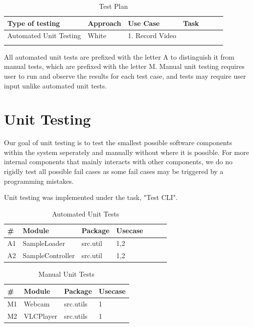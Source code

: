 \documentclass[12pt,a4paper,man]{report}
\begin{document}
\begin{table}[htbp]
\caption{\label{table:testt}
Test Plan}
\centering
\begin{tabular}{|l|l|l|l|l|lp{3cm}|}
\hline
\textbf{Type of testing} & \textbf{Approach} & \textbf{Use Case} & \textbf{Task}\\
\hline
Automated Unit Testing & White & 1. Record Video & \\
 &  &  & \\
\end{tabular}
\end{table}


All automated unit tests are prefixed with the letter A to distinguish it from manual tests, which are prefixed with the letter M. Manual unit testing requires user to run and observe the results for each test case, and tests may require user input unlike automated unit tests.

\section{Unit Testing}
\label{sec:org2c6beea}
Our goal of unit testing is to test the smallest possible software components within the system seperately and manually without where it is possible. For more internal components that mainly interacts with other components, we do no rigidly test all possible fail cases as some fail cases may be triggered by a programming mistakes. 

Unit testing was implemented under the task, "Test CLI". 

\begin{table}[htbp]
\caption{\label{table:autests}
Automated Unit Tests}
\centering
\begin{tabular}{|l|l|l|l|l|lp{3cm}|}
\hline
\textbf{\#} & \textbf{Module} & \textbf{Package} & \textbf{Usecase}\\
\hline
A1 & SampleLoader & src.util & 1,2\\
A2 & SampleController & src.util & 1,2\\
\hline
\end{tabular}
\end{table}

\begin{table}[htbp]
\caption{\label{table:mutests}
Manual Unit Tests}
\centering
\begin{tabular}{|l|l|lp{3cm}|}
\hline
\textbf{\#} & \textbf{Module} & \textbf{Package} & \textbf{Usecase}\\
\hline
M1 & Webcam & src.utils & 1\\
M2 & VLCPlayer & src.utils & 1\\
\hline
\end{tabular}
\end{table}
\end{document}
